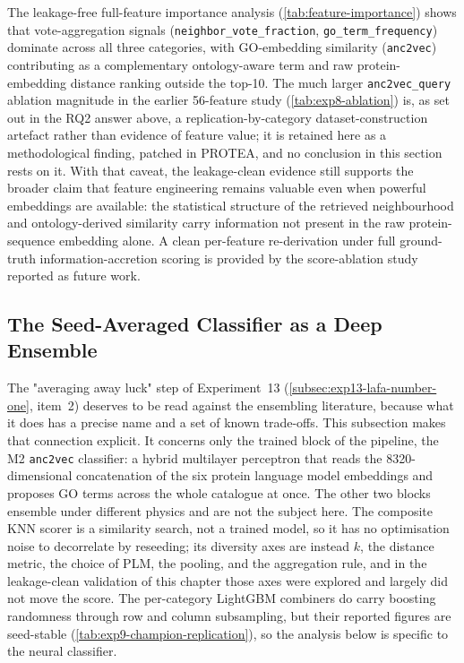 The leakage-free full-feature importance analysis
(\cref{tab:feature-importance}) shows that vote-aggregation signals
(\texttt{neighbor\_vote\_fraction}, \texttt{go\_term\_frequency}) dominate
across all three categories, with GO-embedding similarity (\texttt{anc2vec})
contributing as a complementary ontology-aware term and raw protein-embedding
distance ranking outside the top-10. The much larger \texttt{anc2vec\_query}
ablation magnitude in the earlier 56-feature study
(\cref{tab:exp8-ablation}) is, as set out in the RQ2 answer above, a
replication-by-category dataset-construction artefact rather than evidence of
feature value; it is retained here as a methodological finding, patched in
PROTEA, and no conclusion in this section rests on it. With that caveat, the
leakage-clean evidence still supports the broader claim that feature
engineering remains valuable even when powerful embeddings are available: the
statistical structure of the retrieved neighbourhood and ontology-derived
similarity carry information not present in the raw protein-sequence embedding
alone. A clean per-feature re-derivation under full ground-truth
information-accretion scoring is provided by the score-ablation study reported
as future work.

\subsection{The Seed-Averaged Classifier as a Deep Ensemble}
\label{subsec:seed-ensemble}

The "averaging away luck" step of Experiment~13
(\cref{subsec:exp13-lafa-number-one}, item~2) deserves to be read against the
ensembling literature, because what it does has a precise name and a set of
known trade-offs. This subsection makes that connection explicit. It concerns
only the trained block of the pipeline, the M2 \texttt{anc2vec} classifier: a
hybrid multilayer perceptron that reads the 8320-dimensional concatenation of
the six protein language model embeddings and proposes GO terms across the whole
catalogue at once. The other two blocks ensemble under different physics and are
not the subject here. The composite KNN scorer is a similarity search, not a
trained model, so it has no optimisation noise to decorrelate by reseeding; its
diversity axes are instead $k$, the distance metric, the choice of PLM, the
pooling, and the aggregation rule, and in the leakage-clean validation of this
chapter those axes were explored and largely did not move the score. The
per-category LightGBM combiners do carry boosting randomness through row and
column subsampling, but their reported figures are seed-stable
(\cref{tab:exp9-champion-replication}), so the analysis below is specific to the
neural classifier.

